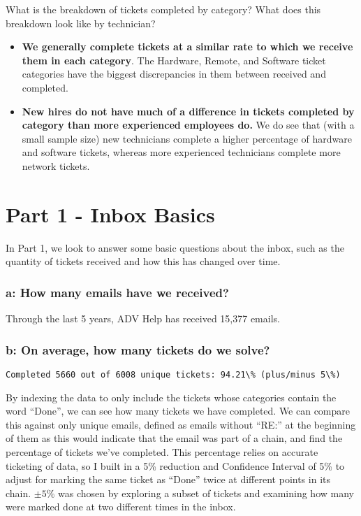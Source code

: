 \documentclass[11pt]{article}
\begin{document}
What is the breakdown of tickets completed by category? What does this
breakdown look like by technician?

\begin{itemize}
\item
  \textbf{We generally complete tickets at a similar rate to which we
  receive them in each category}. The Hardware, Remote, and Software
  ticket categories have the biggest discrepancies in them between
  received and completed. 
\item
  \textbf{New hires do not have much of a difference in tickets
  completed by category than more experienced employees do.} We do see
  that (with a small sample size) new technicians complete a higher
  percentage of hardware and software tickets, whereas more experienced
  technicians complete more network tickets.
\end{itemize}


    \hypertarget{part-1---inbox-basics}{%
\section{Part 1 - Inbox Basics}\label{part-1---inbox-basics}}

In Part 1, we look to answer some basic questions about the inbox, such
as the quantity of tickets received and how this has changed over time.

\hypertarget{a-how-many-emails-have-we-received}{%
\subsubsection{a: How many emails have we
received?}\label{a-how-many-emails-have-we-received}}


    Through the last 5 years, ADV Help has received 15,377 emails.

    \hypertarget{b-on-average-how-many-tickets-do-we-solve}{%
\subsubsection{b: On average, how many tickets do we
solve?}\label{b-on-average-how-many-tickets-do-we-solve}}

    \begin{Verbatim}[commandchars=\\\{\}]
Completed 5660 out of 6008 unique tickets: 94.21\% (plus/minus 5\%)
    \end{Verbatim}

    By indexing the data to only include the tickets whose categories
contain the word ``Done'', we can see how many tickets we have
completed. We can compare this against only unique emails, defined as
emails without ``RE:'' at the beginning of them as this would indicate
that the email was part of a chain, and find the percentage of tickets
we've completed. This percentage relies on accurate ticketing of data,
so I built in a 5\% reduction and Confidence Interval of 5\% to adjust
for marking the same ticket as ``Done'' twice at different points in its
chain. \(\pm 5\%\) was chosen by exploring a subset of tickets and
examining how many were marked done at two different times in the inbox.
\end{document}
